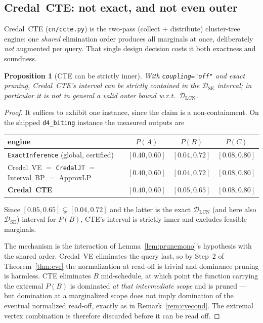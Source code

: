 \documentclass[11pt]{article}
\newtheorem{proposition}{Proposition}
\theoremstyle{definition}
\newcommand{\DSE}{\mathcal{D}_{\mathrm{SE}}}
\newcommand{\DLCN}{\mathcal{D}_{\mathrm{LCN}}}
\begin{document}
\subsection{Credal~CTE: not exact, and not even outer}\label{sec:cte}
Credal~CTE (\texttt{cn/ccte.py}) is the two-pass (collect $+$ distribute) cluster-tree engine: one
\emph{shared} elimination order produces all marginals at once, deliberately \emph{not} augmented per
query. That single design decision costs it both exactness and soundness.

\begin{proposition}[CTE can be strictly inner]\label{prop:cte}
With \texttt{coupling="off"} and exact pruning, Credal~CTE's interval can be strictly contained in the
$\DSE$ interval; in particular it is \emph{not} in general a valid outer bound w.r.t.\ $\DLCN$.
\end{proposition}

\begin{proof}
It suffices to exhibit one instance, since the claim is a non-containment. On the shipped
\texttt{d4\_biting} instance the measured outputs are
\begin{center}\small
\begin{tabular}{@{}lccc@{}}
\toprule
engine & $P(A)$ & $P(B)$ & $P(C)$\\
\midrule
\texttt{ExactInference} (global, certified) & $[0.40,0.60]$ & $\mathbf{[0.04,0.72]}$ & $[0.08,0.80]$\\
Credal~VE $=$ \texttt{CredalJT} $=$ Interval~BP $=$ ApproxLP & $[0.40,0.60]$ & $[0.04,0.72]$ & $[0.08,0.80]$\\
\textbf{Credal~CTE} & $[0.40,0.60]$ & $\mathbf{[0.05,0.65]}$ & $[0.08,0.80]$\\
\bottomrule
\end{tabular}
\end{center}
Since $[0.05,0.65]\subsetneq[0.04,0.72]$ and the latter is the exact $\DLCN$ (and here also $\DSE$)
interval for $P(B)$, CTE's interval is strictly inner and excludes feasible marginals.

The mechanism is the interaction of Lemma~\ref{lem:prunemono}'s hypothesis with the shared order.
Credal~VE eliminates the query last, so by Step~2 of Theorem~\ref{thm:cve} the normalization at
read-off is trivial and dominance pruning is harmless. CTE eliminates $B$ mid-schedule, at which point
the function carrying the extremal $P(B)$ is dominated \emph{at that intermediate scope} and is
pruned --- but domination at a marginalized scope does not imply domination of the eventual
normalized read-off, exactly as in Remark~\ref{rem:cvecond}. The extremal vertex combination is
therefore discarded before it can be read off.
\end{proof}
\end{document}
